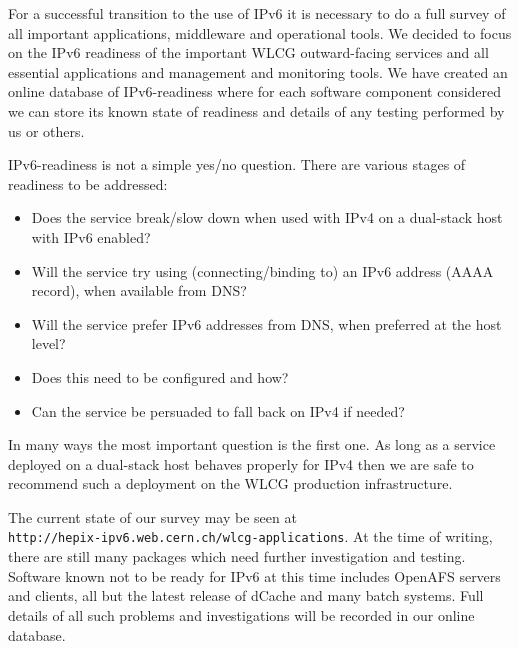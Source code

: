 For a successful transition to the use of IPv6 it is necessary to do a full survey of all important applications, middleware and operational tools. We decided to focus on the IPv6 readiness of the important WLCG outward-facing services and all essential applications and management and monitoring tools. We have created an online database of IPv6-readiness where for each software component considered we can store its known state of readiness and details of any testing performed by us or others.

IPv6-readiness is not a simple yes/no question. There are various stages of readiness to be addressed:
\begin {itemize}
\item Does the service break/slow down when used with IPv4 on a dual-stack host with IPv6 enabled?
\item Will the service try using (connecting/binding to) an IPv6 address (AAAA record), when available from DNS?
\item Will the service prefer IPv6 addresses from DNS, when preferred at the host level?
\item Does this need to be configured and how?
\item Can the service be persuaded to fall back on IPv4 if needed?
\end {itemize}

In many ways the most important question is the first one. As long as a service deployed on a dual-stack host behaves properly for IPv4 then we are safe to recommend such a deployment on the WLCG production infrastructure.

The current state of our survey may be seen at \\
{\tt http://hepix-ipv6.web.cern.ch/wlcg-applications}.
At the time of 
writing, there are still many packages which need further investigation and testing. Software known not to be ready for IPv6 at this time includes OpenAFS servers and clients, all but the latest release of dCache and many batch systems. Full details of all such problems and investigations will be recorded in our online database.


